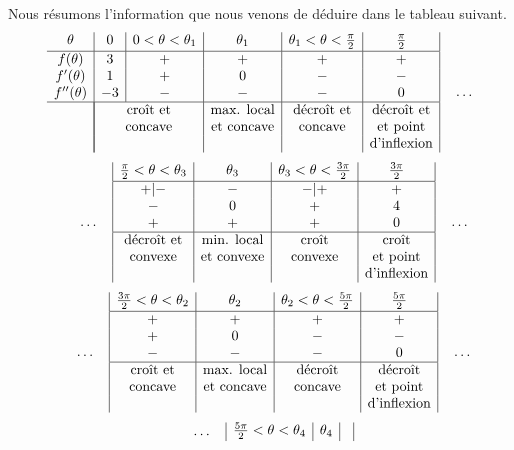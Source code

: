 {Nous résumons l'information que nous venons de déduire dans le tableau suivant.
\[
\begin{array}{c|c|c|c|c|c|}
\rule[-0.5em]{0em}{1em}
\theta & 0 & 0<\theta < \theta_1 & \theta_1 &
\theta_1 < \theta < \frac{\pi}{2} & \frac{\pi}{2} \\
\hline
f(\theta) & 3 & + & + & + & + \\
f'(\theta) & 1 & + & 0 & - & - \\
f''(\theta) & -3 & - & - & - & 0 \\
\hline
& \multicolumn{2}{|c|}{\text{croît et}} & \text{max. local} &
\text{décroît et} & \text{décroît et} \\
& \multicolumn{2}{|c|}{\text{concave}} & \text{et concave} &
\text{concave} & \text{et point} \\
& \multicolumn{2}{|c|}{} & & & \text{d'inflexion}
\end{array} \quad \ldots
\]
\[
\qquad \ldots \quad 
\begin{array}{|c|c|c|c|}
\rule[-0.5em]{0em}{1em}
\frac{\pi}{2} < \theta < \theta_3 & \theta_3 &
\theta_3 < \theta < \frac{3\pi}{2} & \frac{3\pi}{2} \\
\hline
+|- & - & -|+ & + \\
- & 0 & + & 4 \\
+ & + & + & 0 \\
\hline
\text{décroît et} & \text{min. local} & \text{croît} & \text{croît} \\
\text{convexe} & \text{et convexe} & \text{convexe} & \text{et point} \\
& & & \text{d'inflexion}
\end{array} \quad \ldots
\]
\[
\qquad \ldots \quad
\begin{array}{|c|c|c|c|}
\rule[-0.5em]{0em}{1em}
\frac{3\pi}{2} <\theta < \theta_2 & \theta_2 &
\theta_2 < \theta < \frac{5\pi}{2} & \frac{5\pi}{2} \\
\hline
+ & + & + & + \\
+ & 0 & - & - \\
- & - & - & 0 \\
\hline
\text{croît et} & \text{max. local} & \text{décroît} & \text{décroît} \\
\text{concave} & \text{et concave} & \text{concave} & \text{et point} \\
& & & \text{d'inflexion}
\end{array} \quad \ldots
\]
\[
\qquad \ldots \quad
\begin{array}{|c|c|c|c|c|c}
\rule[-0.5em]{0em}{1em}
\frac{5\pi}{2} < \theta < \theta_4 & \theta_4 &

\end{array}\]}
